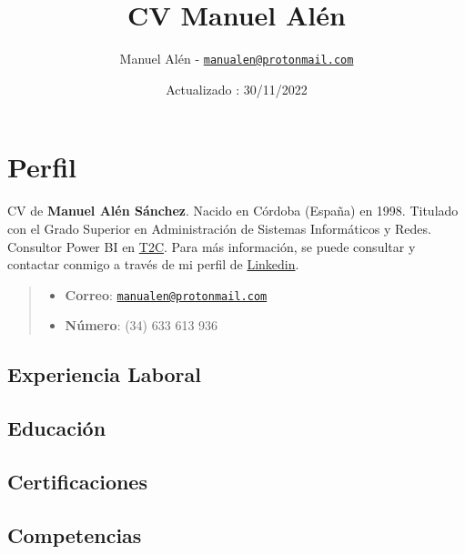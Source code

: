\documentclass[
]{article}
\title{CV Manuel Alén}
\author{Manuel Alén -
\href{mailto:manualen@protonmail.com}{\nolinkurl{manualen@protonmail.com}}}
\date{Actualizado : 30/11/2022}
\providecommand{\tightlist}{%
  \setlength{\itemsep}{0pt}\setlength{\parskip}{0pt}}
\begin{document}
\maketitle

\hypertarget{seccion-1}{%
\section{Perfil}\label{seccion-1}}

CV de \textbf{Manuel Alén Sánchez}. Nacido en Córdoba (España) en 1998.
Titulado con el Grado Superior en Administración de Sistemas
Informáticos y Redes. Consultor Power BI en
\href{https://www.t2client.com/}{T2C}. Para más información, se puede
consultar y contactar conmigo a través de mi perfil de
\href{https://www.linkedin.com/in/manuel-a-90a4548b/}{Linkedin}.

\begin{quote}
\begin{itemize}
\tightlist
\item
  \textbf{Correo}:
  \href{mailto:manualen@protonmail.com}{\nolinkurl{manualen@protonmail.com}}\n
\item
  \textbf{Número}: (34) 633 613 936
\end{itemize}
\end{quote}

\hypertarget{experiencia-laboral}{%
\subsection{Experiencia Laboral}\label{experiencia-laboral}}

\hypertarget{educaciuxf3n}{%
\subsection{Educación}\label{educaciuxf3n}}

\hypertarget{certificaciones}{%
\subsection{Certificaciones}\label{certificaciones}}

\hypertarget{competencias}{%
\subsection{Competencias}\label{competencias}}
\end{document}
